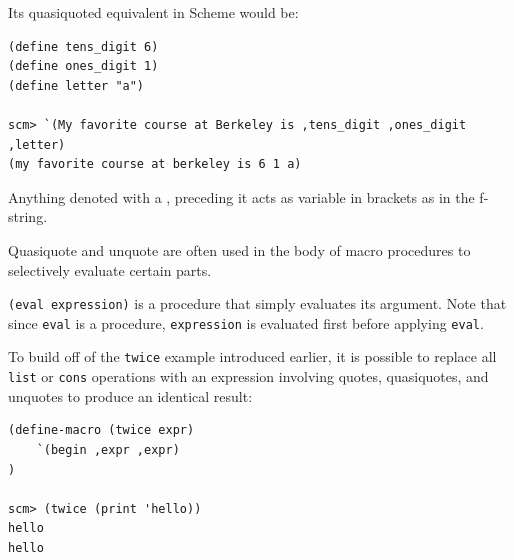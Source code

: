 Its quasiquoted equivalent in Scheme would be:

\begin{lstlisting}
(define tens_digit 6)
(define ones_digit 1)
(define letter "a")

scm> `(My favorite course at Berkeley is ,tens_digit ,ones_digit ,letter)
(my favorite course at berkeley is 6 1 a)
\end{lstlisting}

Anything denoted with a , preceding it acts as variable in brackets as in the f-string.


Quasiquote and unquote are often used in the body of macro procedures to selectively evaluate certain parts. 

\texttt{(eval expression)} is a procedure that simply evaluates its argument. Note that since \texttt{eval} is a procedure, \texttt{expression} is evaluated first before applying \texttt{eval}.

To build off of the \texttt{twice} example introduced earlier, it is possible to replace all \texttt{list} or \texttt{cons} operations with an expression involving quotes, quasiquotes, and unquotes to produce an identical result:

\begin{lstlisting}
(define-macro (twice expr)
    `(begin ,expr ,expr)
)

scm> (twice (print 'hello))
hello
hello
\end{lstlisting}
